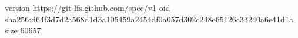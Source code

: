 version https://git-lfs.github.com/spec/v1
oid sha256:d64f3d7d2a568d1d3a105459a2454df0a057d302c248e65126c33240a6e41d1a
size 60657
